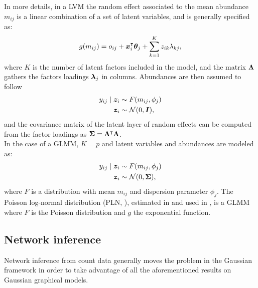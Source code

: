 In more details, in a LVM the random effect associated to the mean abundance $m_{ij}$ is a linear combination of a set of latent variables, and is generally specified as:
 $$g(m_{ij}) = o_{ij}+{\boldsymbol{x}}_i^\intercal  {\boldsymbol{\theta}}_j +\sum_{k=1}^K z_{ik} \lambda_{kj},$$
 where $K$ is the number of latent factors included in the model, and the matrix ${\boldsymbol{\Lambda}}$ gathers the factors loadings ${\boldsymbol{\lambda}}_j$ in columns. Abundances are then assumed to follow
 \begin{align*}
 y_{ij}\mid {\boldsymbol{z}}_i &\sim F(m_{ij}, \phi_j)\\
{\boldsymbol{z}}_i&\sim \mathcal{N}(0, \boldsymbol{I}),
 \end{align*}
and the covariance matrix of the latent layer of random effects can be computed from the factor loadings as ${\boldsymbol{\Sigma}}={\boldsymbol{\Lambda}}^\intercal {\boldsymbol{\Lambda}}$.\\

In the case of a GLMM, $K=p$ and latent variables and abundances are  modeled as:
 \begin{align*}
 y_{ij}\mid {\boldsymbol{z}}_i &\sim F(m_{ij}, \phi_j)\\
 {\boldsymbol{z}}_i &\sim \mathcal{N}(0, {\boldsymbol{\Sigma}}),
 \end{align*} 
 where $F$ is a distribution with mean $m_{ij}$ and dispersion parameter $\phi_j$. The Poisson log-normal distribution (PLN, \citet{AiH89}), estimated in \citet{CMR18} and used in \citet{MRA20}, is a GLMM where $F$ is the Poisson distribution and $g$ the exponential function.  
 
 \subsection{Network inference}
 Network inference from count data generally moves the problem in the Gaussian framework  in order to  take advantage of all the aforementioned results on Gaussian graphical models. \\
 
